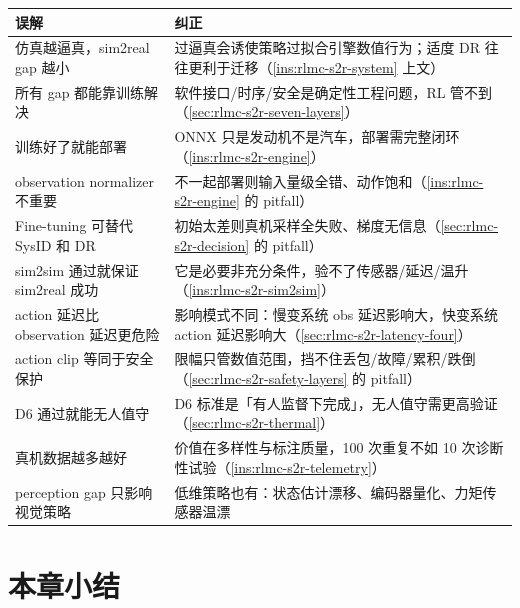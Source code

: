 \begin{center}
\small
\begin{tabular}{@{}p{5.0cm}p{7.0cm}@{}}
\toprule
误解 & 纠正 \\
\midrule
仿真越逼真，sim2real gap 越小 & 过逼真会诱使策略过拟合引擎数值行为；适度 DR 往往更利于迁移（\cref{ins:rlmc-s2r-system} 上文） \\
所有 gap 都能靠训练解决 & 软件接口/时序/安全是确定性工程问题，RL 管不到（\cref{sec:rlmc-s2r-seven-layers}） \\
训练好了就能部署 & ONNX 只是发动机不是汽车，部署需完整闭环（\cref{ins:rlmc-s2r-engine}） \\
observation normalizer 不重要 & 不一起部署则输入量级全错、动作饱和（\cref{ins:rlmc-s2r-engine} 的 pitfall） \\
Fine-tuning 可替代 SysID 和 DR & 初始太差则真机采样全失败、梯度无信息（\cref{sec:rlmc-s2r-decision} 的 pitfall） \\
sim2sim 通过就保证 sim2real 成功 & 它是必要非充分条件，验不了传感器/延迟/温升（\cref{ins:rlmc-s2r-sim2sim}） \\
action 延迟比 observation 延迟更危险 & 影响模式不同：慢变系统 obs 延迟影响大，快变系统 action 延迟影响大（\cref{sec:rlmc-s2r-latency-four}） \\
action clip 等同于安全保护 & 限幅只管数值范围，挡不住丢包/故障/累积/跌倒（\cref{sec:rlmc-s2r-safety-layers} 的 pitfall） \\
D6 通过就能无人值守 & D6 标准是「有人监督下完成」，无人值守需更高验证（\cref{sec:rlmc-s2r-thermal}） \\
真机数据越多越好 & 价值在多样性与标注质量，100 次重复不如 10 次诊断性试验（\cref{ins:rlmc-s2r-telemetry}） \\
perception gap 只影响视觉策略 & 低维策略也有：状态估计漂移、编码器量化、力矩传感器温漂 \\
\bottomrule
\end{tabular}
\end{center}

\section*{本章小结}
\label{sec:rlmc-s2r-summary}

